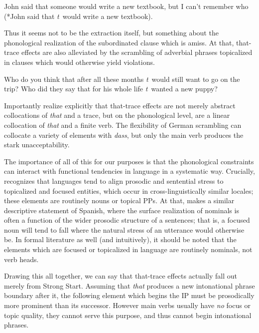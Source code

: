 \documentclass{article}
\newcommand{\Ss}{Strong Start}
\newcommand{\TT}{that-trace effect}
\newcommand{\T}{\textit{t}}
\begin{document}
\begin{exe}
\ex John said that someone would write a new textbook, but I can't remember who (*John said that \T\ would write a new textbook)\label{elide}.
\end{exe}

Thus it seems not to be the extraction itself, but something about the phonological realization of the subordinated clause which is amiss. At that, that-trace effects are also alleviated by the scrambling of adverbial phrases topicalized in clauses which would otherwise yield violations.

\begin{exe}
\ex \begin{xlist}
\ex Who do you think that after all these months \T\ would still want to go on the trip?
\ex Who did they say that for his whole life \T\ wanted a new puppy?
\end{xlist}
\end{exe}

Importantly \citet{salzmann11} realize explicitly that \TT{s} are not merely abstract collocations of \emph{that} and a trace, but on the phonological level, are a linear collocation of \emph{that} and a finite verb. The flexibility of German scrambling can collocate a variety of elements with \emph{dass}, but only the main verb produces the stark unacceptability.

The importance of all of this for our purposes is that the phonological constraints can interact with functional tendencies in language in a systematic way. Crucially, \citet{gundel88} recognizes that languages tend to align prosodic and sentential stress to topicalized and focused entities, which occur in cross-linguistically similar locales; these elements are routinely nouns or topical PPs. At that, \citet{bolinger54} makes a similar descriptive statement of Spanish, where the surface realization of nominals is often a function of the wider prosodic structure of a sentences; that is, a focused noun will tend to fall where the natural stress of an utterance would otherwise be. In formal literature as well \citep{rizzi97} (and intuitively), it should be noted that the elements which are focused or topicalized in language are routinely nominals, not verb heads.

Drawing this all together, we can say that \TT{s} actually fall out merely from \Ss. Assuming that \textit{that} produces a new intonational phrase boundary after it, the following element which begins the IP must be prosodically more prominent than its successor. However main verbs usually have \emph{no} focus or topic quality, they cannot serve this purpose, and thus cannot begin intonational phrases.
\end{document}
